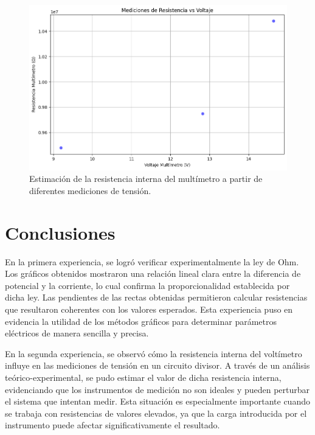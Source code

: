 \documentclass[11pt]{article}
\begin{document}
\begin{figure}[H]
    \centering
    \includegraphics[width=0.9\linewidth]{Rv.png}
    \caption{Estimación de la resistencia interna del multímetro a partir de diferentes mediciones de tensión.}
    \label{fig:rv}
\end{figure}

\section*{Conclusiones}



En la primera experiencia, se logró verificar experimentalmente la ley de Ohm. Los gráficos obtenidos mostraron una relación lineal clara entre la diferencia de potencial y la corriente, lo cual confirma la proporcionalidad establecida por dicha ley. Las pendientes de las rectas obtenidas permitieron calcular resistencias que resultaron coherentes con los valores esperados. Esta experiencia puso en evidencia la utilidad de los métodos gráficos para determinar parámetros eléctricos de manera sencilla y precisa.

En la segunda experiencia, se observó cómo la resistencia interna del voltímetro influye en las mediciones de tensión en un circuito divisor. A través de un análisis teórico-experimental, se pudo estimar el valor de dicha resistencia interna, evidenciando que los instrumentos de medición no son ideales y pueden perturbar el sistema que intentan medir. Esta situación es especialmente importante cuando se trabaja con resistencias de valores elevados, ya que la carga introducida por el instrumento puede afectar significativamente el resultado.
\end{document}
